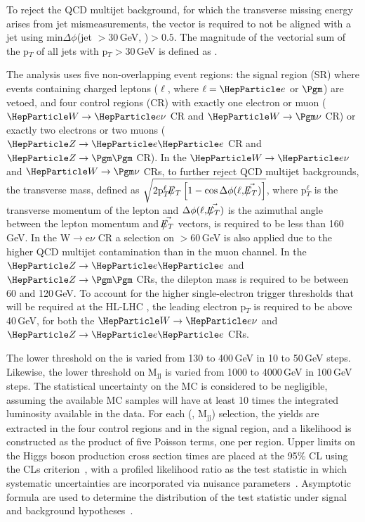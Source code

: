 \documentclass[../report.tex]{subfiles}
\begin{document}
To reject the QCD multijet background, for which the transverse
missing energy arises from jet mismeasurements, the \METvec vector is
required to not be aligned with a jet using min$\Delta\phi$(jet
\ptvec$>30$\,GeV, \METvec)$>0.5$. The magnitude of the vectorial sum of
the p$_{T}$ of all jets with p$_{T}>30$\,GeV is defined as \MHT.

The analysis uses five non-overlapping event regions: the signal
region (SR) where events containing charged leptons ($\ell$, where
$\ell=\Pe$ or $\Pgm$) are vetoed, and four control regions (CR) with
exactly one electron or muon ($\PW\rightarrow\Pe\nu$ CR and
$\PW\rightarrow\Pgm\nu$ CR) or exactly two electrons or two muons
($\PZ\rightarrow\Pe\Pe$ CR and $\PZ\rightarrow\Pgm\Pgm$ CR).  In the
$\PW\rightarrow\Pe\nu$ and $\PW\rightarrow\Pgm\nu$ CRs, to further
reject QCD multijet backgrounds, the transverse mass, defined as
$\sqrt{2\pt^{\ell}\MET\left[1
- \cos{\Delta\phi(\ell,\METvec)}\right]}$, where p$_{T}^{\ell}$ is the
transverse momentum of the lepton and $\Delta\phi(\ell,\METvec)$ is
the azimuthal angle between the lepton momentum and $\METvec$ vectors,
is required to be less than 160\,GeV. In the W$\rightarrow$e$\nu$ CR a
selection on \MET$>60$\,GeV is also applied due to the higher QCD
multijet contamination than in the muon channel. In the
$\PZ\rightarrow\Pe\Pe$ and $\PZ\rightarrow\Pgm\Pgm$ CRs, the dilepton
mass is required to be between 60 and 120\,GeV. To account for the
higher single-electron trigger thresholds that will be required at the
HL-LHC , the leading electron p$_{T}$ is required to be above 40\,GeV,
for both the $\PW\rightarrow\Pe\nu$ and $\PZ\rightarrow\Pe\Pe$ CRs.

The lower threshold on the \MET is varied from 130 to 400\,GeV in 10 to
50\,GeV steps. Likewise, the lower threshold on M$_{\text{jj}}$ is
varied from 1000 to 4000\,GeV in 100\,GeV steps. The statistical
uncertainty on the MC is considered to be negligible, assuming the
available MC samples will have at least 10 times the integrated
luminosity available in the data.  For each (\MET, M$_{\text{jj}}$)
selection, the yields are extracted in the four control regions and in
the signal region, and a likelihood is constructed as the product of
five Poisson terms, one per region.  Upper limits on the Higgs boson
production cross section times
\BHinv are placed at the 95\% CL using the CLs
criterion~\cite{Read:2002hq,Junk:1999kv,Dittmaier:2012vm}, with a profiled
likelihood ratio as the test statistic in which systematic
uncertainties are incorporated via nuisance
parameters~\cite{Chatrchyan:2013lba,CMS-NOTE-2011-005}. Asymptotic
formula are used to determine the distribution of the test statistic
under signal and background hypotheses~\cite{Cowan:2010js}.
\end{document}

